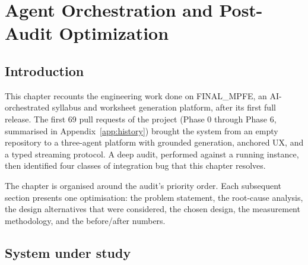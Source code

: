 %
%

\chapter{Agent Orchestration and Post-Audit Optimization}
\label{ch:opt}

\section{Introduction}

This chapter recounts the engineering work done on FINAL\_MPFE, an AI-orchestrated
syllabus and worksheet generation platform, after its first full release. The
first 69 pull requests of the project (Phase 0 through Phase 6, summarised in
Appendix~\ref{app:history}) brought the system from an empty repository to a
three-agent platform with grounded generation, anchored UX, and a typed
streaming protocol. A deep audit, performed against a running instance, then
identified four classes of integration bug that this chapter resolves.

The chapter is organised around the audit's priority order. Each subsequent
section presents one optimisation: the problem statement, the root-cause
analysis, the design alternatives that were considered, the chosen design, the
measurement methodology, and the before/after numbers.

\section{System under study}


